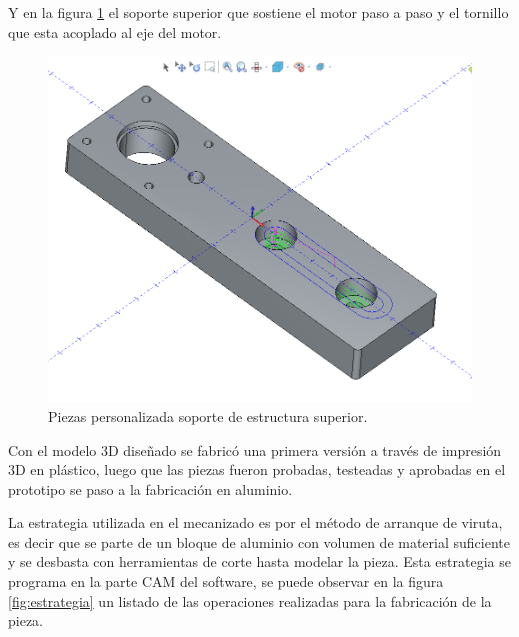 Y en la figura \ref{fig:estructura_superior} el soporte superior que sostiene el motor paso a paso y el  tornillo que esta acoplado al eje del motor.

\begin{figure}[ht]
	\centering
	\includegraphics[width=.5\textwidth]{./Figures/3d_top.png}
	\caption{Piezas personalizada soporte de estructura superior.}
	\label{fig:estructura_superior}
\end{figure}

Con el modelo 3D diseñado se fabricó una primera versión a través de impresión 3D en plástico, luego que las piezas fueron probadas, testeadas y aprobadas en el prototipo se paso a la fabricación en aluminio.

La estrategia utilizada en el mecanizado es por el método de arranque de viruta, es decir que se parte de un bloque de aluminio con volumen de material suficiente y se desbasta con herramientas de corte hasta modelar la pieza. Esta estrategia se programa en la parte CAM del software, se puede observar en la figura \ref{fig:estrategia} un listado de las operaciones realizadas para la fabricación de la pieza.

